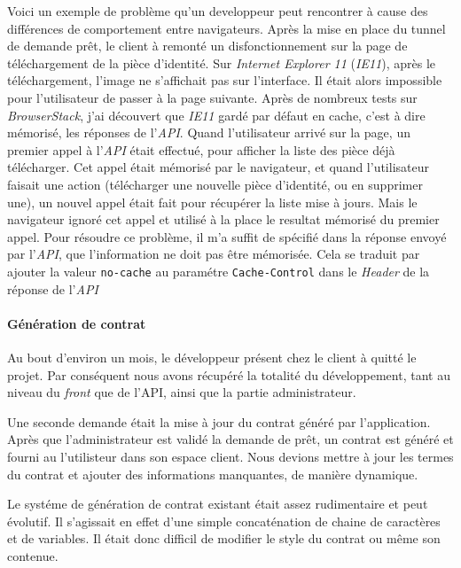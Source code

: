 Voici un exemple de problème qu'un developpeur peut rencontrer à cause
des différences de comportement entre navigateurs. Après la mise en
place du tunnel de demande prêt, le client à remonté un
disfonctionnement sur la page de téléchargement de la pièce d'identité.
Sur \emph{Internet Explorer 11} (\emph{IE11}), après le téléchargement,
l'image ne s'affichait pas sur l'interface. Il était alors impossible
pour l'utilisateur de passer à la page suivante. Après de nombreux tests
sur \emph{BrowserStack}, j'ai découvert que \emph{IE11} gardé par défaut
en cache, c'est à dire mémorisé, les réponses de l'\emph{API}. Quand
l'utilisateur arrivé sur la page, un premier appel à l'\emph{API} était
effectué, pour afficher la liste des pièce déjà télécharger. Cet appel
était mémorisé par le navigateur, et quand l'utilisateur faisait une
action (télécharger une nouvelle pièce d'identité, ou en supprimer une),
un nouvel appel était fait pour récupérer la liste mise à jours. Mais le
navigateur ignoré cet appel et utilisé à la place le resultat mémorisé
du premier appel. Pour résoudre ce problème, il m'a suffit de spécifié
dans la réponse envoyé par l'\emph{API}, que l'information ne doit pas
être mémorisée. Cela se traduit par ajouter la valeur \texttt{no-cache}
au paramétre \texttt{Cache-Control} dans le \emph{Header} de la réponse
de l'\emph{API}

\bigskip

\paragraph{Génération de contrat}\label{guxe9nuxe9ration-de-contrat}

Au bout d'environ un mois, le développeur présent chez le client à
quitté le projet. Par conséquent nous avons récupéré la totalité du
développement, tant au niveau du \emph{front} que de l'API, ainsi que la
partie administrateur.

\bigskip

Une seconde demande était la mise à jour du contrat généré par
l'application. Après que l'administrateur est validé la demande de prêt,
un contrat est généré et fourni au l'utilisteur dans son espace client.
Nous devions mettre à jour les termes du contrat et ajouter des
informations manquantes, de manière dynamique.

\bigskip

Le systéme de génération de contrat existant était assez rudimentaire et
peut évolutif. Il s'agissait en effet d'une simple concaténation de
chaine de caractères et de variables. Il était donc difficil de modifier
le style du contrat ou même son contenue.

